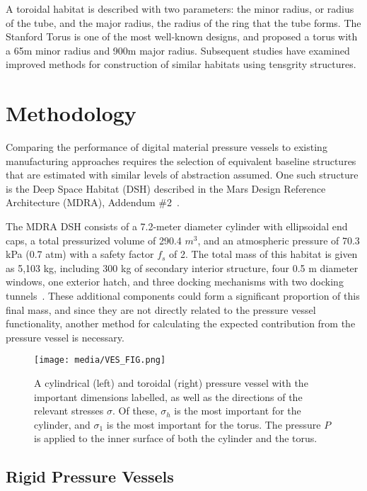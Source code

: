 \documentclass[twocolumn,letterpaper]{IEEEAerospaceCLS}  %
\begin{document}
A toroidal habitat is described with two parameters: the minor radius, or radius of the tube, and the major radius, the radius of the ring that the tube forms. The Stanford Torus is one of the most well-known designs, and proposed a torus with a 65m minor radius and 900m major radius. Subsequent studies have examined improved methods for construction of similar habitats using tensgrity structures\cite{skelton2014growth}.

\section{Methodology}
Comparing the performance of digital material pressure vessels to existing manufacturing approaches requires the selection of equivalent baseline structures that are estimated with similar levels of abstraction assumed. One such structure is the Deep Space Habitat (DSH) described in the Mars Design Reference Architecture (MDRA), Addendum \#2~\cite{drake2010human}.   

The MDRA DSH consists of a 7.2-meter diameter cylinder with ellipsoidal end caps, a total pressurized volume of 290.4 $m^3$, and an atmospheric pressure of 70.3 kPa (0.7 atm) with a safety factor $f_s$ of 2. The total mass of this habitat is given as 5,103 kg, including 300 kg of secondary interior structure, four 0.5 m diameter windows, one exterior hatch, and three docking mechanisms with two docking tunnels~\cite{drake2010human}. These additional components could form a significant proportion of this final mass, and since they are not directly related to the pressure vessel functionality, another method for calculating the expected contribution from the pressure vessel is necessary.

\begin{figure}\label{cylinder}
\centering
\texttt{[image: media/VES\_FIG.png]}\\
\caption{A cylindrical (left) and toroidal (right) pressure vessel with the important dimensions labelled, as well as the directions of the relevant stresses $\sigma$. Of these, $\sigma_h$ is the most important for the cylinder, and $\sigma_1$ is the most important for the torus. The pressure $P$ is applied to the inner surface of both the cylinder and the torus.}
\end{figure}

\subsection{Rigid Pressure Vessels}
\end{document}
